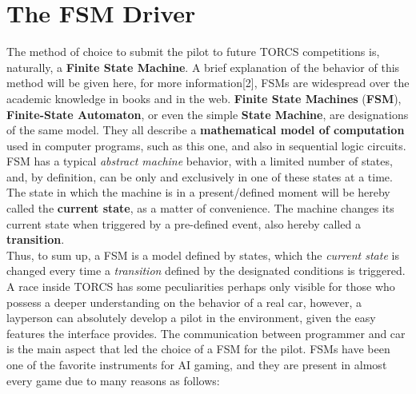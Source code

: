 \section{The FSM Driver}

The method of choice to submit the pilot to future TORCS competitions is, naturally, a \textbf{Finite State Machine}. A brief explanation of the behavior of this method will be given here, for more information[2], FSMs are widespread over the academic knowledge in books and in the web.
\textbf{Finite State Machines} (\textbf{FSM}), \textbf{Finite-State Automaton}, or even the simple \textbf{State Machine}, are designations of the same model. They all describe a \textbf{mathematical model of computation} used in computer programs, such as this one, and also in sequential logic circuits. FSM has a typical \textit{abstract machine} behavior, with a limited number of states, and, by definition, can be only and exclusively in one of these states at a time. The state in which the machine is in a present/defined moment will be hereby called the \textbf{current state}, as a matter of convenience. The machine changes its current state when triggered by a pre-defined event, also hereby called a \textbf{transition}.\\
Thus, to sum up, a FSM is a model defined by states, which the \textit{current state} is changed every time a \textit{transition} defined by the designated conditions is triggered.\\[0.2cm]
A race inside TORCS has some peculiarities perhaps only visible for those who possess a deeper understanding on the behavior of a real car, however, a layperson can absolutely develop a pilot in the environment, given the easy features the interface provides. The communication between programmer and car is the main aspect that led the choice of a FSM for the pilot. FSMs have been one of the favorite instruments for AI gaming, and they are present in almost every game due to many reasons as follows:

